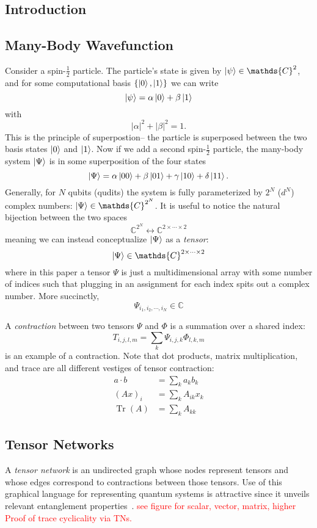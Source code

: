 \documentclass[12pt]{article}
\DeclareMathOperator{\Tr}{Tr}
\begin{document}
\begin{multicols}{2}

\section*{Introduction}
	\subsection*{Many-Body Wavefunction}
		Consider a spin-$\frac{1}{2}$ particle. The particle's state is given by $\ket{\psi}\in\mathds{C}^2$, and for some computational basis $\{\ket{0}, \ket{1}\}$ we can write
		$$\ket{\psi}=\alpha\ket{0}+\beta\ket{1}$$ with
		$$|\alpha|^2+|\beta|^2=1.$$ This is the principle of superpostion-- the particle is superposed between the two basis states $\ket{0}$ and $\ket{1}$. Now if we add a second spin-$\frac{1}{2}$ particle, the many-body system $\ket{\Psi}$ is in some superposition of the four states
		$$\ket{\Psi}=\alpha\ket{00}+\beta\ket{01}+\gamma\ket{10}+\delta\ket{11}.$$
		Generally, for $N$ qubits (qudits) the system is fully parameterized by $2^N$ ($d^N$) complex numbers: $\ket{\Psi}\in\mathds{C}^{2^N}$. It is useful to notice the natural bijection between the two spaces
		$$\mathds{C}^{2^N}\longleftrightarrow \mathds{C}^{2\times\cdots\times 2}$$
		meaning we can instead conceptualize $\ket{\Psi}$ as a \textit{tensor}:
		$$\ket{\Psi}\in\mathds{C}^{2\times\cdots\times2}$$
		where in this paper a tensor $\Psi$ is just a multidimensional array with some number of indices such that plugging in an assignment for each index spits out a complex number. More succinctly,
		$$\Psi_{i_1,i_2,\cdots,i_N}\in\mathds{C}$$

		A \textit{contraction} between two tensors $\Psi$ and $\Phi$ is a summation over a shared index:
		$$T_{i,j,l,m}=\sum_k\Psi_{i,j,k}\Phi_{l,k,m}$$
		is an example of a contraction. Note that dot products, matrix multiplication, and trace are all different vestiges of tensor contraction:
				\begin{align}
				a\cdot b &=\sum_ka_kb_k\\
				(Ax)_{i} &=\sum_kA_{ik}x_k\\
				\Tr(A)&=\sum_kA_{kk}
			\end{align}

	\subsection*{Tensor Networks}
	A \textit{tensor network} is an undirected graph whose nodes represent tensors and whose edges correspond to contractions between those tensors. Use of this graphical language for representing quantum systems is attractive since it unveils relevant entanglement properties~\cite{TnIntro}.
	\textcolor{red}{see figure for scalar, vector, matrix, higher}\\
	\textcolor{red}{Proof of trace cyclicality via TNs.}

\end{multicols}
\end{document}
